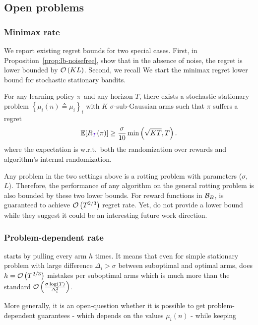 \subsection{Open problems}

\subsubsection{Minimax rate}
We report existing regret bounds for two special cases. First, in Proposition~\ref{prop:lb-noisefree}, \citet{heidari2016tight} show that in the absence of noise, the regret is lower bounded by $\mathcal{O}\left(KL\right)$. Second, we recall  We start the minimax regret lower bound for stochastic stationary bandits.

\begin{proposition}{\cite[Thm.\,5.1]{auer2002nonstochastic}}
\label{stochastic-LB}
For any learning policy $\pi$ and any horizon $T$, there exists a stochastic stationary problem $\left\{ \mu_i (n) \triangleq \mu_i\right\}_i$ with $K$ $\sigma$-sub-Gaussian arms such that $\pi$ suffers a regret
\begin{equation*}
 \mathbb{E}[\regret(\policy)] \geq \frac{\sigma}{10}\min\pa{\sqrt{\narms\timeEnd},\timeEnd}.
\end{equation*}
where the expectation is w.r.t.\ both the randomization
over rewards and algorithm's internal randomization.
\end{proposition}

Any problem in the two settings above is a rotting problem with parameters ($\sigma$, $L$). Therefore, the performance of any algorithm on the general rotting problem is also bounded by these two lower bounds. For reward functions in $\mathcal{B}_{B}$, \SWA is guaranteed to achieve $\mathcal{O}\left(T^{2/3}\right)$ regret rate. Yet, \citet{levine2017rotting} do not provide a lower bound while they suggest it could be an interesting future work direction.

\subsubsection{Problem-dependent rate}
\SWA starts by pulling every arm $h$ times. It means that even for simple stationary problem with large difference $\Delta_i > \sigma$ between suboptimal and optimal arms, \SWA does $h = \mathcal{O}\left(T^{2/3}\right)$ mistakes per suboptimal arms which is much more than the standard $\mathcal{O}\left(\frac{\sigma\log\left(T\right)}{\Delta_i^2}\right)$.

More generally, it is an open-question whether it is possible to get problem-dependent guarantees - which depends on the values $\mu_i(n)$ - while keeping 


